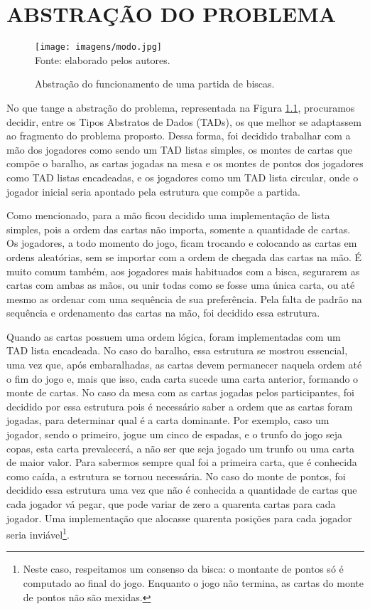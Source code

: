 \documentclass[12pt, oneside, a4paper, brazil]{abntex2}
\begin{document}
\chapter{ABSTRAÇÃO DO PROBLEMA}\label{cap:2}

\begin{figure}[H]
    \centering
    \caption{Abstração do funcionamento de uma partida de biscas.}
    \texttt{[image: imagens/modo.jpg]}\\
    \small{Fonte: elaborado pelos autores.}
    \label{fig:modo}
\end{figure}

No que tange a abstração do problema, representada na Figura \ref{fig:modo}, procuramos decidir, entre os Tipos Abstratos de Dados (TADs), os que melhor se adaptassem ao fragmento do problema proposto. Dessa forma, foi decidido trabalhar com a mão dos jogadores como sendo um TAD listas simples, os montes de cartas que compõe o baralho, as cartas jogadas na mesa e os montes de pontos dos jogadores como TAD listas encadeadas, e os jogadores como um TAD lista circular, onde o jogador inicial seria apontado pela estrutura que compõe a partida.

Como mencionado, para a mão ficou decidido uma implementação de lista simples, pois a ordem das cartas não importa, somente a quantidade de cartas. Os jogadores, a todo momento do jogo, ficam trocando e colocando as cartas em ordens aleatórias, sem se importar com a ordem de chegada das cartas na mão. É muito comum também, aos jogadores mais habituados com a bisca, segurarem as cartas com ambas as mãos, ou unir todas como se fosse uma única carta, ou até mesmo as ordenar com uma sequência de sua preferência. Pela falta de padrão na sequência e ordenamento das cartas na mão, foi decidido essa estrutura.

Quando as cartas possuem uma ordem lógica, foram implementadas com um TAD lista encadeada. No caso do baralho, essa estrutura se mostrou essencial, uma vez que, após embaralhadas, as cartas devem permanecer naquela ordem até o fim do jogo e, mais que isso, cada carta sucede uma carta anterior, formando o monte de cartas. No caso da mesa com as cartas jogadas pelos participantes, foi decidido por essa estrutura pois é necessário saber a ordem que as cartas foram jogadas, para determinar qual é a carta dominante. Por exemplo, caso um jogador, sendo o primeiro, jogue um cinco de espadas, e o trunfo do jogo seja copas, esta carta prevalecerá, a não ser que seja jogado um trunfo ou uma carta de maior valor. Para sabermos sempre qual foi a primeira carta, que é conhecida como caída, a estrutura se tornou necessária. No caso do monte de pontos, foi decidido essa estrutura uma vez que não é conhecida a quantidade de cartas que cada jogador vá pegar, que pode variar de zero a quarenta cartas para cada jogador. Uma implementação que alocasse quarenta posições para cada jogador seria inviável\footnote{Neste caso, respeitamos um consenso da bisca: o montante de pontos só é computado ao final do jogo. Enquanto o jogo não termina, as cartas do monte de pontos não são mexidas.}.
\end{document}
